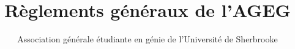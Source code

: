 \documentclass[10pt,letterpaper]{report}
\title{Règlements généraux de l’AGEG}
\author{Association générale étudiante en génie de l'Université de Sherbrooke}
\begin{document}

\tableofcontents
\newpage

\begin{sloppypar}

















\end{sloppypar}
\end{document}
